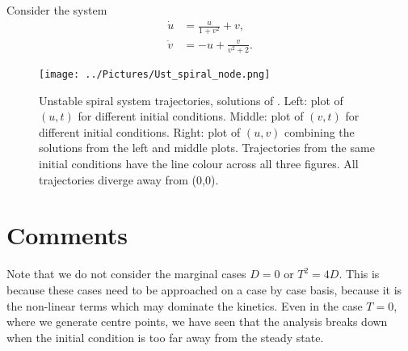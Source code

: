 \begin{example}[frametitle=Unstable spiral]
Consider the system
\begin{align}
\dot{u}&=\frac{u}{1+v^2}+v,\label{Ust_spiral_1}\\
\dot{v}&=-u+\frac{v}{v^2+2}\label{Ust_spiral_2}.
\end{align}
\end{example}
\begin{figure}[!!!h!!!tb]
\centering
\texttt{[image: ../Pictures/Ust\_spiral\_node.png]}
\caption{\label{Ust_spiral_node}Unstable spiral system trajectories, solutions of . Left: plot of $(u,t)$ for different initial conditions. Middle: plot of $(v,t)$ for different initial conditions. Right: plot of $(u,v)$ combining the solutions from the left and middle plots. Trajectories from the same initial conditions have the line colour across all three figures. All trajectories diverge away from (0,0).}
\end{figure}

\section{Comments}
Note that we do not consider the marginal cases $D=0$ or $T^2=4D$. This is because these cases need to be approached on a case by case basis, because it is the non-linear terms which may dominate the kinetics. Even in the case $T=0$, where we generate centre points, we have seen that the analysis breaks down when the initial condition is too far away from the steady state.


